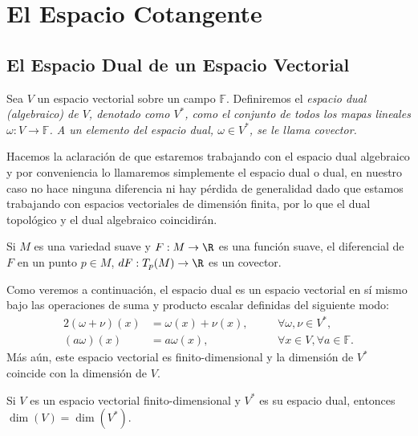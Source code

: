 \section{El Espacio Cotangente}\label{Sección: Espacio Cotangente}
\subsection{El Espacio Dual de un Espacio Vectorial}

\begin{definition}
  Sea $V$ un espacio vectorial sobre un campo $\mathbb{F}$. Definiremos el \it{espacio dual (algebraico) de $V$}, denotado como $V^*$, como el conjunto de todos los mapas lineales $\omega: V \to \mathbb{F}$. A un elemento del espacio dual, $\omega \in V^*$, se le llama \it{covector}.
\end{definition}

Hacemos la aclaración de que estaremos trabajando con el espacio dual algebraico y por conveniencia lo llamaremos simplemente el espacio dual o dual, en nuestro caso no hace ninguna diferencia ni hay pérdida de generalidad dado que estamos trabajando con espacios vectoriales de dimensión finita, por lo que el dual topológico y el dual algebraico coincidirán.

\begin{example}
	Si $M$ es una variedad suave y $F: M \to \R$ es una función suave, el diferencial de $F$ en un punto $p \in M$, $dF: T_p(M) \to \R$ es un covector.
\end{example}

Como veremos a continuación, el espacio dual es un espacio vectorial en sí mismo bajo las operaciones de suma y producto escalar definidas del siguiente modo:
\begin{alignat*}{2}
	(\omega+\nu)(x) & =\omega(x)+\nu(x), \quad &  & \forall \omega,\nu \in V^{*},           \\
	(a\omega)(x)    & = a\omega(x), \quad      &  & \forall x\in V,\forall a \in\mathbb{F}.
\end{alignat*}
Más aún, este espacio vectorial es finito-dimensional y la dimensión de $V^{*}$ coincide con la dimensión de $V$.

\begin{theorem}\label{Teorema: Dimensión del Espacio Dual}
	Si $V$ es un espacio vectorial finito-dimensional y $V^{*}$ es su espacio dual, entonces $\dim(V) = \dim(V^{*})$.
\end{theorem}

